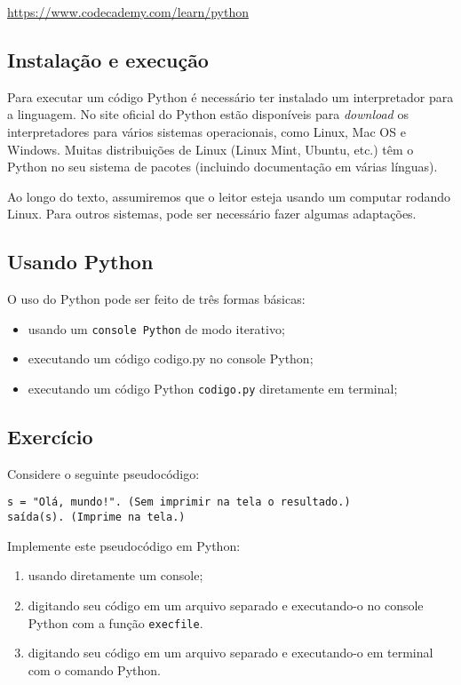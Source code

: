 \documentclass[
  a4paper,
  DIV=11,
  numbers=noendperiod,
  oneside]{scrreprt}
\providecommand{\tightlist}{%
  \setlength{\itemsep}{0pt}\setlength{\parskip}{0pt}}\usepackage{longtable,booktabs,array}
\DeclareRobustCommand{\href}[2]{#2\sidenote{\footnotesize \url{#1}}}
\begin{document}
\url{https://www.codecademy.com/learn/python}

\subsection{Instalação e
execução}\label{instalauxe7uxe3o-e-execuuxe7uxe3o}

Para executar um código Python é necessário ter instalado um
interpretador para a linguagem. No \href{https://www.python.org/}{site
oficial do Python} estão disponíveis para \emph{download} os
interpretadores para vários sistemas operacionais, como Linux, Mac OS e
Windows. Muitas distribuições de Linux (Linux Mint, Ubuntu, etc.) têm o
Python no seu sistema de pacotes (incluindo documentação em várias
línguas).

Ao longo do texto, assumiremos que o leitor esteja usando um computar
rodando Linux. Para outros sistemas, pode ser necessário fazer algumas
adaptações.

\subsection{Usando Python}\label{usando-python}

O uso do Python pode ser feito de três formas básicas:

\begin{itemize}
\tightlist
\item
  usando um \texttt{console\ Python} de modo iterativo;
\item
  executando um código codigo.py no console Python;
\item
  executando um código Python \texttt{codigo.py} diretamente em
  terminal;
\end{itemize}

\subsection{Exercício}\label{exercuxedcio-2}

Considere o seguinte pseudocódigo:

\begin{verbatim}
s = "Olá, mundo!". (Sem imprimir na tela o resultado.)
saída(s). (Imprime na tela.)
\end{verbatim}

Implemente este pseudocódigo em Python:

\begin{enumerate}
\def\labelenumi{\alph{enumi})}
\tightlist
\item
  usando diretamente um console;
\item
  digitando seu código em um arquivo separado e executando-o no console
  Python com a função \texttt{execfile}.
\item
  digitando seu código em um arquivo separado e executando-o em terminal
  com o comando Python.
\end{enumerate}
\end{document}
